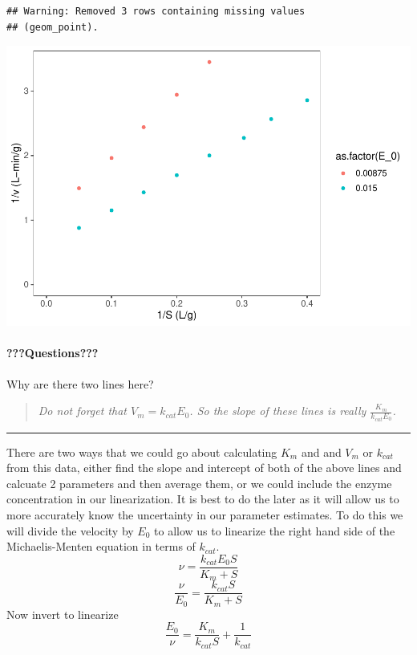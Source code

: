 \documentclass[
]{article}
\begin{document}
\begin{verbatim}
## Warning: Removed 3 rows containing missing values
## (geom_point).
\end{verbatim}

\includegraphics{Bioprocess_Engineering_files/figure-latex/unnamed-chunk-31-1.pdf}

\hypertarget{questions-11}{%
\paragraph{???Questions???}\label{questions-11}}

Why are there two lines here?

\begin{quote}
\emph{Do not forget that \(V_m = k_{cat}E_0\). So the slope of these lines is really \(\frac{K_m}{k_{cat}E_0}\).}
\end{quote}

\begin{center}\rule{0.5\linewidth}{0.5pt}\end{center}

There are two ways that we could go about calculating \(K_m\) and and \(V_m\) or \(k_{cat}\) from this data, either find the slope and intercept of both of the above lines and calcuate 2 parameters and then average them, or we could include the enzyme concentration in our linearization. It is best to do the later as it will allow us to more accurately know the uncertainty in our parameter estimates. To do this we will divide the velocity by \(E_0\) to allow us to linearize the right hand side of the Michaelis-Menten equation in terms of \(k_{cat}\).
\[\nu = \frac{k_{cat}E_0S}{K_m + S}\]
\[\frac{\nu}{E_0} = \frac{k_{cat}S}{K_m + S}\]
Now invert to linearize
\[\frac{E_0}{\nu} = \frac{K_m}{k_{cat}S} + \frac{1}{k_{cat}}\]
\end{document}
